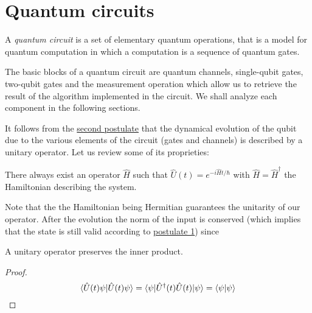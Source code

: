 \section{Quantum circuits}
A \emph{quantum circuit} is a set of elementary quantum operations, that is a model for quantum computation in which a computation is a sequence of quantum gates.

The basic blocks of a quantum circuit are quantum channels, single-qubit gates, two-qubit gates and the measurement operation which allow us to retrieve the result of the algorithm implemented in the circuit. We shall analyze each component in the following sections.

It follows from the \hyperref[postulate:2]{second postulate} that the dynamical evolution of the qubit due to the various elements of the circuit (gates and channels) is described by a unitary operator. Let us review some of its proprieties: 
\begin{theorem}\label{theorem:1}
There always exist an operator $\hat{H}$ such that $\hat{U}(t) = e^{-i\hat{H}t/\hbar}$ with $\hat{H} = \hat{H}^\dagger$ the Hamiltonian describing the system. \cite{Shankar}
\end{theorem}

Note that the the Hamiltonian being Hermitian guarantees the unitarity of our operator. After the evolution the norm of the input is conserved (which implies that the state is still valid according to \hyperref[postulate:1]{postulate 1}) since
\begin{theorem}
A unitary operator preserves the inner product.
\end{theorem}
\begin{proof}
\begin{equation*}
    \braket{\hat{U}(t)\psi | \hat{U}(t)\psi} = \braket{ \psi | \hat{U}^\dagger(t)\hat{U}(t) | \psi} = \braket{\psi | \psi}
\end{equation*}
\end{proof}


